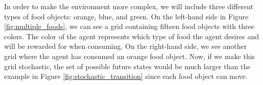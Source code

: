 \documentclass[12pt,A4]{report}
\theoremstyle{definition}
\begin{document}
In order to make the environment more complex, we will include three different types of food objects: orange, blue, and green. On the left-hand side in Figure \ref{fig:multiple_foods}, we can see a grid containing fifteen food objects with three colors. The color of the agent represents which type of food the agent desires and will be rewarded for when consuming. On the right-hand side, we see another grid where the agent has consumed an orange food object. Now, if we make this grid stochastic, the set of possible future states would be much larger than the example in Figure \ref{fig:stochastic_transition} since each food object can move. 
\end{document}
